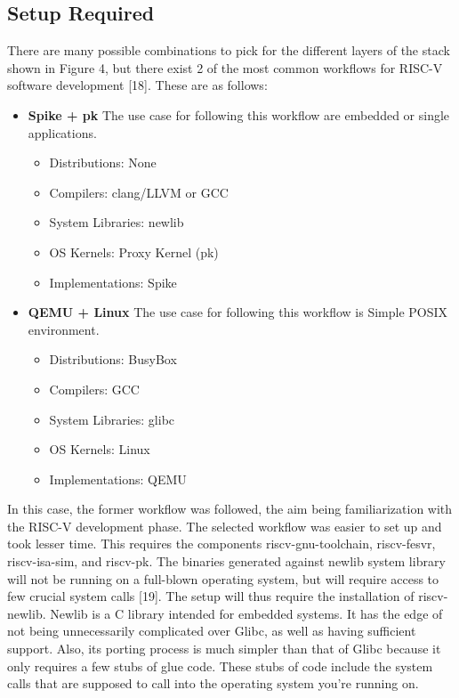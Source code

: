 \subsection{Setup Required}
 \label{sect6_2_2}
There are many possible combinations to pick for the different layers of the stack shown in Figure 4, but there exist 2 of the most common workflows for RISC-V software development [18]. These are as follows:
\begin{itemize}
\item \textbf{Spike + pk} \newline
The use case for following this workflow are embedded or single applications.
\begin{itemize}
\item Distributions: None
\item Compilers: clang/LLVM or GCC
\item System Libraries: newlib
\item OS Kernels: Proxy Kernel (pk)
\item Implementations: Spike
\end{itemize}	
	
\item \textbf{QEMU + Linux} \newline
The use case for following this workflow is Simple POSIX environment.
\begin{itemize}
\item Distributions: BusyBox
\item Compilers: GCC
\item System Libraries: glibc
\item OS Kernels: Linux
\item Implementations: QEMU
\end{itemize}
\end{itemize}
In this case, the former workflow was followed, the aim being familiarization with the RISC-V development phase. The selected workflow was easier to set up and took lesser time. This requires the components riscv-gnu-toolchain, riscv-fesvr, riscv-isa-sim, and riscv-pk. \newline\newline
The binaries generated against newlib system library will not be running on a full-blown operating system, but will require access to few crucial system calls [19]. The setup will thus require the installation of riscv-newlib. Newlib is a C library intended for embedded systems. It has the edge of not being unnecessarily complicated over Glibc, as well as having sufficient support. Also, its porting process is much simpler than that of Glibc because it only requires a few stubs of glue code. These stubs of code include the system calls that are supposed to call into the operating system you’re running on.

